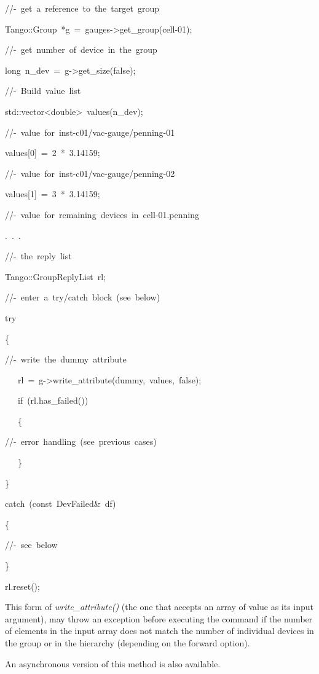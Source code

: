 
\begin{lyxcode}
//-~get~a~reference~to~the~target~group

Tango::Group~{*}g~=~gauges->get\_group(\textquotedbl{}cell-01\textquotedbl{});

//-~get~number~of~device~in~the~group

long~n\_dev~=~g->get\_size(false);

//-~Build~value~list

std::vector<double>~values(n\_dev);

//-~value~for~inst-c01/vac-gauge/penning-01

values{[}0{]}~=~2~{*}~3.14159;

//-~value~for~inst-c01/vac-gauge/penning-02

values{[}1{]}~=~3~{*}~3.14159;

//-~value~for~remaining~devices~in~cell-01.penning

.~.~.

//-~the~reply~list

Tango::GroupReplyList~rl;

//-~enter~a~try/catch~block~(see~below)

try

\{

//-~write~the~\textquotedbl{}dummy\textquotedbl{}~attribute

~~~rl~=~g->write\_attribute(\textquotedbl{}dummy\textquotedbl{},~values,~false);

~~~if~(rl.has\_failed())

~~~\{

//-~error~handling~(see~previous~cases)

~~~\}

\}

catch~(const~DevFailed\&~df)

\{

//-~see~below

\}

rl.reset();
\end{lyxcode}


This form of \emph{write\_attribute()} (the
one that accepts an array of value as its input argument), may throw
an exception before executing the command if the number of elements
in the input array does not match the number of individual devices
in the group or in the hierarchy (depending on the forward option). 

An asynchronous version of this method is also available.


